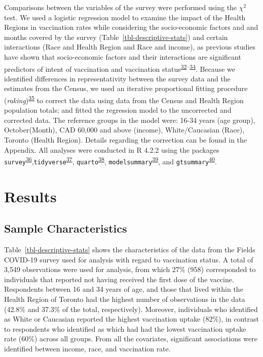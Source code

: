 \documentclass[
  letterpaper,
  DIV=11,
  numbers=noendperiod]{scrartcl}
\begin{document}
Comparisons between the variables of the survey were performed using the
\(\chi^2\) test. We used a logistic regression model to examine the
impact of the Health Regions in vaccination rates while considering the
socio-economic factors and and months covered by the survey
(Table~\ref{tbl-descriptive-stats}) and certain interactions (Race and
Health Region and Race and income), as previous studies have shown that
socio-economic factors and their interactions are significant predictors
of intent of vaccination and vaccination
status\textsuperscript{\protect\hyperlink{ref-nguyen2022}{32}--\protect\hyperlink{ref-cnat2022a}{34}}.
Because we identified differences in representativity between the survey
data and the estimates from the Census, we used an iterative
proportional fitting procedure
(\emph{raking})\textsuperscript{\protect\hyperlink{ref-deming1940}{35}}
to correct the data using data from the Census and Health Region
population totals; and fitted the regression model to the uncorrected
and corrected data. The reference groups in the model were: 16-34 years
(age group), October(Month), CAD 60,000 and above (income),
White/Caucasian (Race), Toronto (Health Region). Details regarding the
correction can be found in the Appendix. All analyses were conducted in
R 4.2.2 using the packages
\texttt{survey}\textsuperscript{\protect\hyperlink{ref-lumley2011}{36}},\texttt{tidyverse}\textsuperscript{\protect\hyperlink{ref-wickham2019}{37}},
\texttt{quarto}\textsuperscript{\protect\hyperlink{ref-quarto}{38}},
\texttt{modelsummary}\textsuperscript{\protect\hyperlink{ref-modelsummary}{39}},
and
\texttt{gtsummary}\textsuperscript{\protect\hyperlink{ref-gtsummary}{40}}.

\hypertarget{results}{%
\section{Results}\label{results}}

\hypertarget{sample-characteristics}{%
\subsection{Sample Characteristics}\label{sample-characteristics}}

Table~\ref{tbl-descriptive-stats} shows the characteristics of the data
from the Fields COVID-19 survey used for analysis with regard to
vaccination status. A total of 3,549 observations were used for
analysis, from which 27\% (958) corresponded to individuals that
reported not having received the first dose of the vaccine. Respondents
between 16 and 34 years of age, and those that lived within the Health
Region of Toronto had the highest number of observations in the data
(42.8\% and 37.3\% of the total, respectively). Moreover, individuals
who identified as White or Caucasian reported the highest vaccination
uptake (82\%), in contrast to respondents who identified as which had
had the lowest vaccination uptake rate (60\%) across all groups. From
all the covariates, significant associations were identified between
income, race, and vaccination rate.
\end{document}

